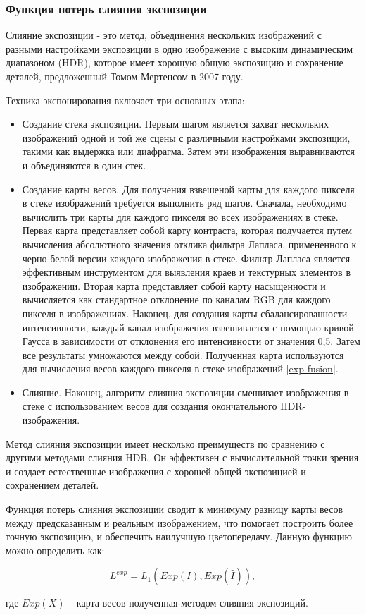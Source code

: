 \subsubsection{Функция потерь слияния экспозиции}

Слияние экспозиции - это метод, объединения нескольких изображений с разными настройками экспозиции в одно изображение с высоким динамическим диапазоном (HDR), которое имеет хорошую общую экспозицию и сохранение деталей, предложенный Томом Мертенсом в 2007 году.

Техника экспонирования включает три основных этапа:

\begin{itemize}
    \item Создание стека экспозиции. Первым шагом является захват нескольких изображений одной и той же сцены с различными настройками экспозиции, такими как выдержка или диафрагма. Затем эти изображения выравниваются и объединяются в один стек.

    \item Создание карты весов. Для получения взвешеной карты для каждого пикселя в стеке изображений требуется выполнить ряд шагов. Сначала, необходимо вычислить три карты для каждого пикселя во всех изображениях в стеке. Первая карта представляет собой карту контраста, которая получается путем вычисления абсолютного значения отклика фильтра Лапласа, примененного к черно-белой версии каждого изображения в стеке. Фильтр Лапласа является эффективным инструментом для выявления краев и текстурных элементов в изображении. Вторая карта представляет собой карту насыщенности и вычисляется как стандартное отклонение по каналам RGB для каждого пикселя в изображениях. Наконец, для создания карты сбалансированности интенсивности, каждый канал изображения взвешивается с помощью кривой Гаусса в зависимости от отклонения его интенсивности от значения 0,5. Затем все результаты умножаются между собой. Полученная карта используются для вычисления весов каждого пикселя в стеке изображений \ref{exp-fusion}. 

    \item Слияние. Наконец, алгоритм слияния экспозиции смешивает изображения в стеке с использованием весов для создания окончательного HDR-изображения. 
\end{itemize}


Метод слияния экспозиции имеет несколько преимуществ по сравнению с другими методами слияния HDR. Он эффективен с вычислительной точки зрения и создает естественные изображения с хорошей общей экспозицией и сохранением деталей.

Функция потерь слияния экспозиции сводит к минимуму разницу карты весов между предсказанным и реальным изображением, что помогает построить более точную экспозицию, и обеспечить наилучшую цветопередачу. Данную функцию можно определить как:

\begin{equation}
    \label{eq:5-3-5}
    L^{exp} = L_1(Exp(I), Exp(\hat{I})),
\end{equation}

где $Exp(X)$ -- карта весов полученная методом слияния экспозиций.
